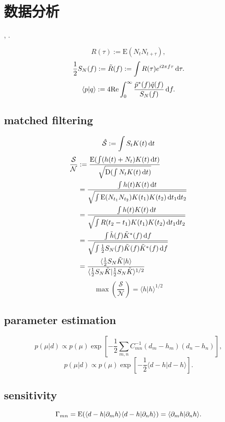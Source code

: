 \chapter{数据分析}

\cite{Finn1992}, \cite{Maggiore2014}.

\def\la{\langle}
\def\ra{\rangle}
\begin{equation}
    R(\tau):=\text{E}(N_tN_{t+\tau}),
\end{equation}
\begin{equation}
    \frac{1}{2}S_{N}(f):=\tilde{R}(f):=\int R(\tau)e^{i2\pi f\tau}\,\mathrm{d}\tau.
\end{equation}
\begin{equation}
    \la p|q \ra:=4\text{Re}\int_0^\infty\frac{\tilde{p}^*(f)\tilde{q}(f)}{S_{N}(f)}\,\d f.
\end{equation}

\section{matched filtering}

\begin{equation}
    \hat{\mathcal{S}}:=\int S_tK(t)\,\mathrm{d} t
\end{equation}
\begin{align}
    \frac{\mathcal{S}}{\mathcal{N}}&:=\frac{\text{E}(\int (h(t)+N_t)K(t)\,\d t)}{\sqrt{\text{D}(\int N_tK(t)\,\d t)}}\\
    &=\frac{\int h(t)K(t)\,\d t}{\sqrt{\int \text{E}(N_{t_1}N_{t_2})K(t_1)K(t_2)\,\d t_1\d t_2}}\\
    &=\frac{\int h(t)K(t)\,\d t}{\sqrt{\int R(t_2-t_1)K(t_1)K(t_2)\,\d t_1\d t_2}}\\
    &=\frac{\int \t{h}(f)\t{K}^*(f)\,\d f}{\sqrt{\int\frac{1}{2}S_{N}(f)\t{K}(f)\t{K}^*(f)\,\d f}}\\
    &=\frac{\la \frac{1}{2}S_{N}\t{K}|h \ra}{\la \frac{1}{2}S_{N}\t{K}|\frac{1}{2}S_{N}\t{K} \ra^{1/2}}
\end{align}
\begin{equation}
    \max{(\frac{\mathcal{S}}{\mathcal{N}})}=\la h|h \ra^{1/2}
\end{equation}

\section{parameter estimation}

\begin{equation}
    p(\mu|d)\propto p(\mu)\exp\left[-\frac{1}{2}\sum_{m,n}C_{mn}^{-1}(d_m-h_m)(d_n-h_n)\right],
\end{equation}
\begin{equation}
    p(\mu|d)\propto p(\mu)\exp\left[-\frac{1}{2}\la d-h|d-h \ra\right].
\end{equation}

\section{sensitivity}

\begin{equation}
    \Gamma_{mn}=\text{E}(\la d-h|\p_m h\ra\la d-h|\p_n h \ra)=\la \p_m h|\p_n h \ra.
\end{equation}
